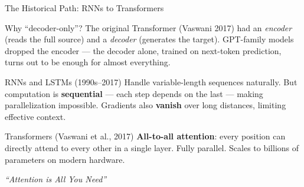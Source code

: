 \documentclass[aspectratio=169, 10pt]{beamer}
\begin{document}
{
\begin{frame}[plain]{}
\end{frame}
}

\begin{frame}{The Historical Path: RNNs to Transformers}

\begin{exampleblock}{Why ``decoder-only''?}
The original Transformer (Vaswani 2017) had an \emph{encoder} (reads the full source) and a \emph{decoder} (generates the target). GPT-family models dropped the encoder --- the decoder alone, trained on next-token prediction, turns out to be enough for almost everything.
\end{exampleblock}

\vspace{8pt}
\begin{block}{RNNs and LSTMs (1990s--2017)}
\vspace{4pt}
Handle variable-length sequences naturally. But computation is \textbf{sequential} --- each step depends on the last --- making parallelization impossible. Gradients also \textbf{vanish} over long distances, limiting effective context.
\end{block}

\vspace{10pt}

\begin{exampleblock}{Transformers (Vaswani et al., 2017)}
\vspace{4pt}
\textbf{All-to-all attention}: every position can directly attend to every other in a single layer. Fully parallel. Scales to billions of parameters on modern hardware.

\vspace{6pt}
\begin{center}
\large\textit{``Attention is All You Need''}
\end{center}
\end{exampleblock}

\end{frame}
\end{document}
